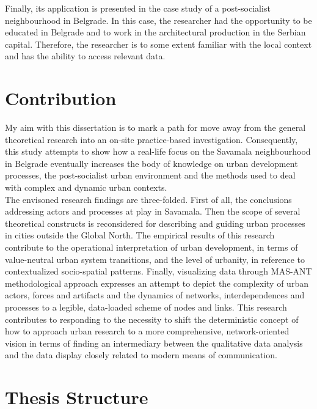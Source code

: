 \documentclass[11pt]{report}
\begin{document}
{{Finally, its application is presented in the case study of a post-socialist neighbourhood in Belgrade. In this case, the researcher had the opportunity to be educated in Belgrade and to work in the architectural production in the Serbian capital. Therefore, the researcher is to some extent familiar with the local context and has the ability to access relevant data.

\section{Contribution}

My aim with this dissertation is to mark a path for move away from the general theoretical research into an on-site practice-based investigation. Consequently, this study attempts to show how a real-life focus on the Savamala neighbourhood in Belgrade eventually increases the body
of knowledge on urban development processes, the post-socialist urban environment and the methods used to deal with complex and dynamic urban contexts.
\\

The envisoned research findings are three-folded.
First of all, the conclusions addressing actors and processes at play in Savamala.
Then the scope of several theoretical constructs is reconsidered for describing and guiding urban processes in cities outside the Global North.
The empirical results of this research contribute to the operational interpretation of urban development, in terms of value-neutral urban system transitions, and the level of urbanity, in reference to contextualized socio-spatial patterns.
Finally, visualizing data through MAS-ANT methodological approach expresses an attempt to depict the complexity of urban actors, forces and artifacts and the dynamics of networks, interdependences and processes to a legible, data-loaded scheme of nodes and links. This research contributes to responding to the necessity to shift the deterministic concept of how to approach urban research to a more comprehensive, network-oriented vision in terms of finding an intermediary between the qualitative data analysis and the data display closely related to modern means of communication.

\section{Thesis Structure}

}}
\end{document}
